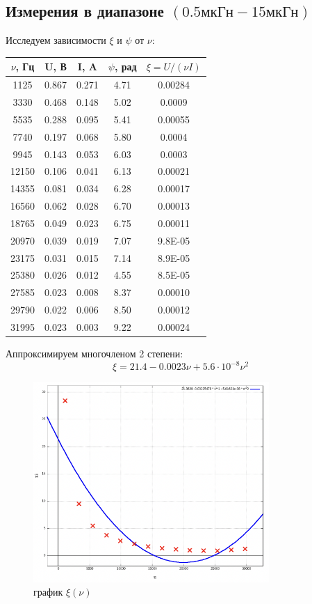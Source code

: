 \documentclass[11pt]{article}
\begin{document}
\subsection{Измерения в диапазоне \((0.5мкГн - 15мкГн)\)}
Исследуем зависимости \(\xi\) и \(\psi\) от \(\nu\):
\begin{table}[H]
    \centering
    \begin{tabular}{|c|c|c|c|c|}
    \hline
    \(\nu\), Гц & U, В  & I, A  & \(\psi\), рад & \(\xi = U/(\nu I)\) \\\hline
    1125  & 0.867 & 0.271 & 4.71 & 0.00284 \\\hline
    3330  & 0.468 & 0.148 & 5.02 & 0.0009  \\\hline
    5535  & 0.288 & 0.095 & 5.41 & 0.00055 \\\hline
    7740  & 0.197 & 0.068 & 5.80 & 0.0004  \\\hline
    9945  & 0.143 & 0.053 & 6.03 & 0.0003  \\\hline
    12150 & 0.106 & 0.041 & 6.13 & 0.00021 \\\hline
    14355 & 0.081 & 0.034 & 6.28 & 0.00017 \\\hline
    16560 & 0.062 & 0.028 & 6.70 & 0.00013 \\\hline
    18765 & 0.049 & 0.023 & 6.75 & 0.00011 \\\hline
    20970 & 0.039 & 0.019 & 7.07 & 9.8E-05 \\\hline
    23175 & 0.031 & 0.015 & 7.14 & 8.9E-05 \\\hline
    25380 & 0.026 & 0.012 & 4.55 & 8.5E-05 \\\hline
    27585 & 0.023 & 0.008 & 8.37 & 0.00010 \\\hline
    29790 & 0.022 & 0.006 & 8.50 & 0.00012 \\\hline
    31995 & 0.023 & 0.003 & 9.22 & 0.00024 \\\hline
    \end{tabular}
\end{table}

Аппроксимируем многочленом 2 степени:
\[ \xi = 21.4 - 0.0023\nu + 5.6\cdot 10^{-8}\nu^2 \]

\begin{figure}[H]
    \centering
    \includegraphics[width=0.8\textwidth]{4.png}
    \caption{график \( \xi(\nu) \)}
\end{figure}
\end{document}

